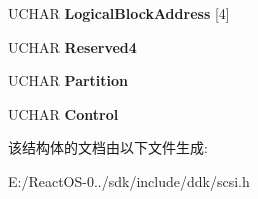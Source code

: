 \begin{DoxyCompactItemize}
U\+C\+H\+AR {\bfseries Logical\+Block\+Address} \mbox{[}4\mbox{]}
\item 
\mbox{\label{struct___c_d_b_1_1___l_o_c_a_t_e_a715dbcbb709d39cc9b83cfde6fb4c77d}} 
U\+C\+H\+AR {\bfseries Reserved4}
\item 
\mbox{\label{struct___c_d_b_1_1___l_o_c_a_t_e_ac697fa721204f21cf881312c73661b66}} 
U\+C\+H\+AR {\bfseries Partition}
\item 
\mbox{\label{struct___c_d_b_1_1___l_o_c_a_t_e_a3f81c14d81f7d588476f8bc99b208780}} 
U\+C\+H\+AR {\bfseries Control}
\end{DoxyCompactItemize}


该结构体的文档由以下文件生成\+:\begin{DoxyCompactItemize}
\item 
E\+:/\+React\+O\+S-\/0../sdk/include/ddk/scsi.\+h\end{DoxyCompactItemize}
